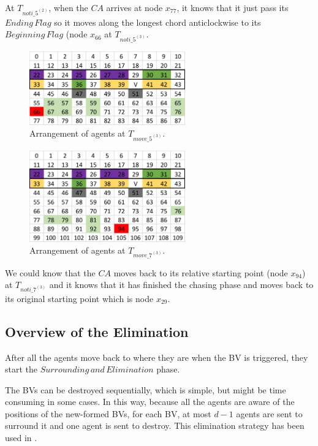 At $T_{noti\_5^{(2)}}$, when the $CA$ arrives at node $x_{77}$, it knows that it just pass its $Ending\,Flag$ so it moves along the longest chord anticlockwise to its $Beginning\,Flag$ (node $x_{66}$ at $T_{noti\_5^{(3)}}$.
\begin{figure}[H]
  \centering  
  \includegraphics[width=0.6\textwidth]{figures/T66.png}
  \caption{Arrangement of agents at $T_{move\_5^{(3)}}$. }\label{fig:T66}
\end{figure}

\begin{figure}[H]
  \centering  
  \includegraphics[width=0.6\textwidth]{figures/T94.png}
  \caption{Arrangement of agents at $T_{move\_7^{(3)}}$. }\label{fig:T94}
\end{figure}

We could know that the $CA$ moves back to its relative starting point (node $x_{94}$) at $T_{noti\_7^{(3)}}$ and it knows that it has finished the chasing phase and moves back to its original starting point which is node $x_{29}$.


\subsection{Overview of the Elimination}
After all the agents move back to where they are when the BV is triggered, they start the $Surrounding\,and\,Elimination$ phase. 

The BVs can be destroyed sequentially,  which is simple,  but might be time consuming in some cases. In this way, because all the agents are aware of the positions of the new-formed BVs,   for each BV,  at most $d-1$ agents are sent to surround it  and one agent is sent to destroy. This elimination strategy has been used in \cite{Alotaibi}. 

